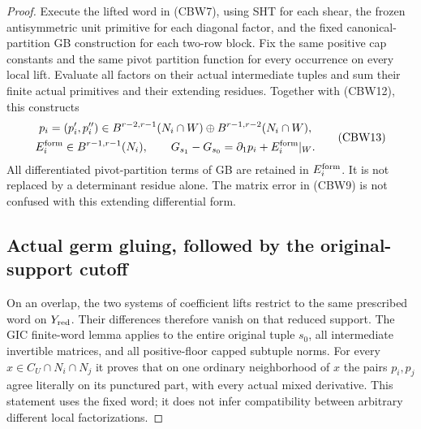 \begin{proof}
Execute the lifted word in (CBW7), using SHT for each shear, the
frozen antisymmetric unit primitive for each diagonal factor, and
the fixed canonical-partition GB construction for each two-row
block.  Fix the same positive cap constants and the same pivot
partition function for every occurrence on every local lift.
Evaluate all factors on their actual intermediate tuples and sum
their finite actual primitives and their extending residues.
Together with (CBW12), this constructs
\[
 \begin{gathered}
 p_i=(p_i',p_i'')\in
 B^{r-2,r-1}(N_i\cap W)\oplus B^{r-1,r-2}(N_i\cap W),\\
 E_i^{\rm form}\in B^{r-1,r-1}(N_i),\qquad
 G_{s_1}-G_{s_0}=\partial_1p_i+E_i^{\rm form}|_W.
 \end{gathered}
 \tag{CBW13}
\]
All differentiated pivot-partition terms of GB are retained in
$E_i^{\rm form}$.  It is not replaced by a determinant residue
alone.  The matrix error in (CBW9) is not confused with this
extending differential form.

\subsection{Actual germ gluing, followed by the original-support cutoff}

On an overlap, the two systems of coefficient lifts restrict to
the same prescribed word on $Y_{\rm red}$.  Their differences
therefore vanish on that reduced support.  The GIC finite-word
lemma applies to the entire original tuple $s_0$, all intermediate
invertible matrices, and all positive-floor capped subtuple norms.
For every $x\in C_U\cap N_i\cap N_j$ it proves that on one
ordinary neighborhood of $x$ the pairs $p_i,p_j$ agree literally
on its punctured part, with every actual mixed derivative.
This statement uses the fixed word; it does not infer compatibility
between arbitrary different local factorizations.


\end{proof}
